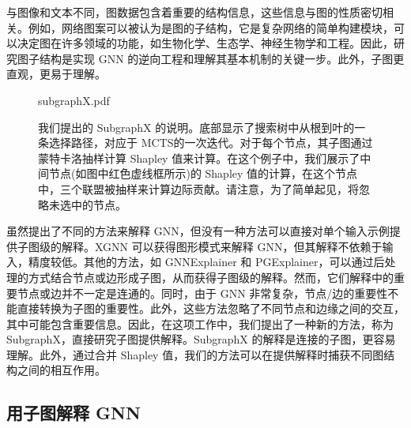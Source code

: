 \documentclass[final]{cvpr}
\begin{document}
与图像和文本不同，图数据包含着重要的结构信息，这些信息与图的性质密切相关。例如，网络图案可以被认为是图的子结构，它是复杂网络的简单构建模块，可以决定图在许多领域的功能，如生物化学、生态学、神经生物学和工程。因此，研究图子结构是实现 GNN 的逆向工程和理解其基本机制的关键一步。此外，子图更直观，更易于理解。

\begin{figure}[t]
	\centering
	\begin{overpic}[width=\textwidth]{subgraphX.pdf} \small
	\end{overpic}
	\caption{我们提出的 SubgraphX 的说明。底部显示了搜索树中从根到叶的一条选择路径，对应于 MCTS的一次迭代。对于每个节点，其子图通过蒙特卡洛抽样计算 Shapley 值来计算。在这个例子中，我们展示了中间节点(如图中红色虚线框所示)的 Shapley 值的计算，在这个节点中，三个联盟被抽样来计算边际贡献。请注意，为了简单起见，将忽略未选中的节点。} \label{fig:fig1}
\end{figure}

虽然提出了不同的方法来解释 GNN，但没有一种方法可以直接对单个输入示例提供子图级的解释。XGNN 可以获得图形模式来解释 GNN，但其解释不依赖于输入，精度较低。其他的方法，如 GNNExplainer 和 PGExplainer，可以通过后处理的方式结合节点或边形成子图，从而获得子图级的解释。然而，它们解释中的重要节点或边并不一定是连通的。同时，由于 GNN 非常复杂，节点/边的重要性不能直接转换为子图的重要性。此外，这些方法忽略了不同节点和边缘之间的交互，其中可能包含重要信息。因此，在这项工作中，我们提出了一种新的方法，称为 SubgraphX，直接研究子图提供解释。SubgraphX 的解释是连接的子图，更容易理解。此外，通过合并 Shapley 值，我们的方法可以在提供解释时捕获不同图结构之间的相互作用。


\subsection{用子图解释 GNN}
\end{document}
